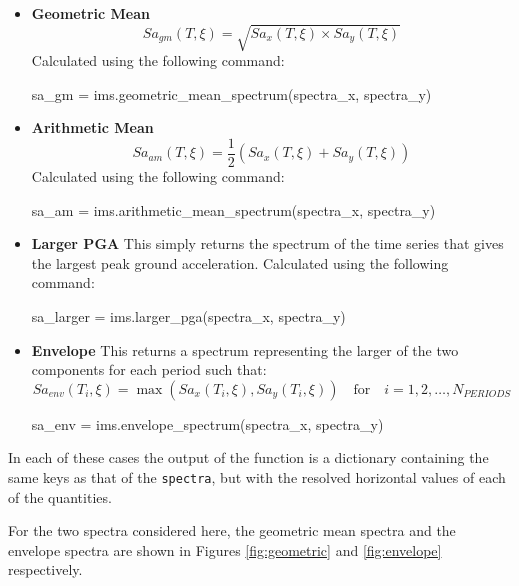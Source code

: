 \begin{itemize}
\item \textbf{Geometric Mean}
    \begin{equation}
    Sa_{gm} \left( {T, \xi} \right) = \sqrt{Sa_x \left( {T, \xi} \right) \times Sa_y \left( {T, \xi} \right)}
    \end{equation}
    Calculated using the following command:
    \begin{python}
sa_gm = ims.geometric_mean_spectrum(spectra_x, spectra_y)
    \end{python}
    
\item \textbf{Arithmetic Mean}
    \begin{equation}
    Sa_{am} \left( {T, \xi} \right) = \frac{1}{2} \left( {Sa_x \left( {T, \xi} \right) + Sa_y \left( {T, \xi} \right)} \right)
    \end{equation}  
        Calculated using the following command:
    \begin{python}
sa_am = ims.arithmetic_mean_spectrum(spectra_x, spectra_y)
    \end{python}  

\item \textbf{Larger PGA}
    This simply returns the spectrum of the time series that gives the largest peak ground acceleration. Calculated using the following command:
    \begin{python}
sa_larger = ims.larger_pga(spectra_x, spectra_y)
    \end{python}   

\item \textbf{Envelope}
    This returns a spectrum representing the larger of the two components for each period such that:
    \begin{equation}
    Sa_{env} \left( {T_i, \xi} \right) = \max\left( {Sa_x \left( {T_i, \xi} \right), Sa_y \left( {T_i, \xi} \right)} \right) \quad \text{for} \quad i = 1, 2, \ldots, N_{PERIODS}  
    \end{equation}
    \begin{python}
sa_env = ims.envelope_spectrum(spectra_x, spectra_y)
    \end{python}  
\end{itemize}

In each of these cases the output of the function is a dictionary containing the same keys as that of the \verb=spectra=, but with the resolved horizontal values of each of the quantities. 

For the two spectra considered here, the geometric mean spectra and the envelope spectra are shown in Figures \ref{fig:geometric} and \ref{fig:envelope} respectively. 

